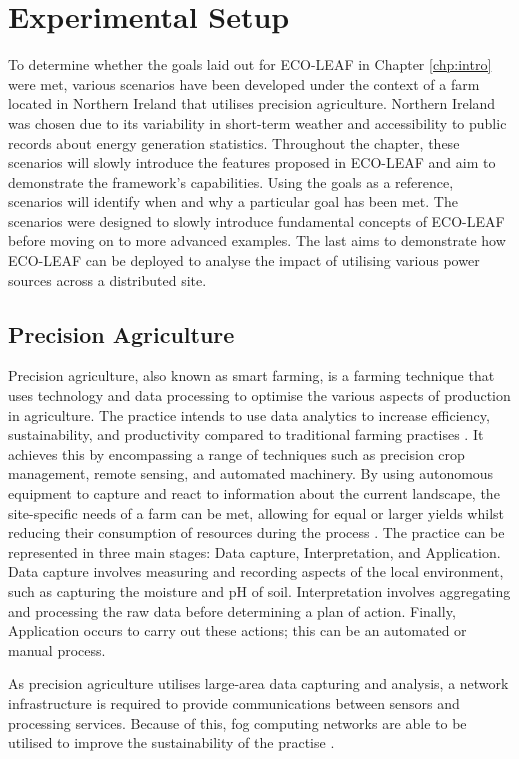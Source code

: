 \documentclass{l4proj}
\begin{document}
\section{Experimental Setup}\label{eval:sec:scenarios}
To determine whether the goals laid out for ECO-LEAF in Chapter \ref{chp:intro} were met, various scenarios have been developed under the context of a farm located in Northern Ireland that utilises precision agriculture.
Northern Ireland was chosen due to its variability in short-term weather and accessibility to public records about energy generation statistics.
Throughout the chapter, these scenarios will slowly introduce the features proposed in ECO-LEAF and aim to demonstrate the framework's capabilities.
Using the goals as a reference, scenarios will identify when and why a particular goal has been met.
The scenarios were designed to slowly introduce fundamental concepts of ECO-LEAF before moving on to more advanced examples. The last aims to demonstrate how ECO-LEAF can be deployed to analyse the impact of utilising various power sources across a distributed site.

\subsection{Precision Agriculture}\label{eval:subsec:precision-agriculture}
Precision agriculture, also known as smart farming, is a farming technique that uses technology and data processing to optimise the various aspects of production in agriculture.
The practice intends to use data analytics to increase efficiency, sustainability, and productivity compared to traditional farming practises \citep{precison-agriculture}.
It achieves this by encompassing a range of techniques such as precision crop management, remote sensing, and automated machinery.
By using autonomous equipment to capture and react to information about the current landscape, the site-specific needs of a farm can be met, allowing for equal or larger yields whilst reducing their consumption of resources during the process \citep{precison-agriculture}.
The practice can be represented in three main stages: Data capture, Interpretation, and Application.
Data capture involves measuring and recording aspects of the local environment, such as capturing the moisture and pH of soil.
Interpretation involves aggregating and processing the raw data before determining a plan of action.
Finally, Application occurs to carry out these actions; this can be an automated or manual process.

As precision agriculture utilises large-area data capturing and analysis, a network infrastructure is required to provide communications between sensors and processing services.
Because of this, fog computing networks are able to be utilised to improve the sustainability of the practise \citep{fog_smart_farming}.
\end{document}
